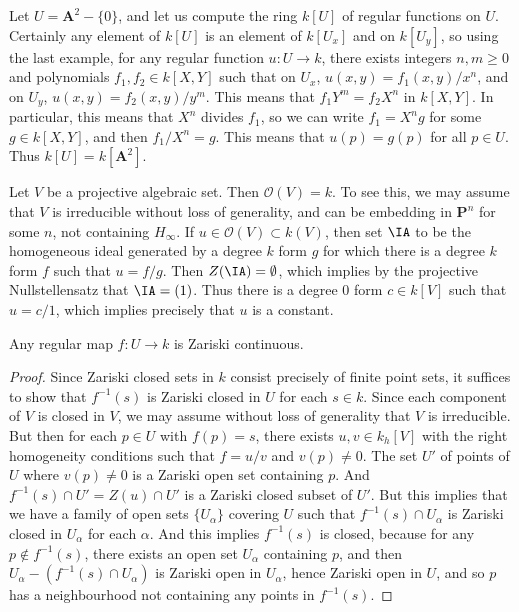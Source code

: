 \begin{example}
    Let $U = \mathbf{A}^2 - \{ 0 \}$, and let us compute the ring $k[U]$ of regular functions on $U$. Certainly any element of $k[U]$ is an element of $k[U_x]$ and on $k[U_y]$, so using the last example, for any regular function $u: U \to k$, there exists integers $n,m \geq 0$ and polynomials $f_1,f_2 \in k[X,Y]$ such that on $U_x$, $u(x,y) = f_1(x,y)/x^n$, and on $U_y$, $u(x,y) = f_2(x,y)/y^m$. This means that $f_1 Y^m = f_2 X^n$ in $k[X,Y]$. In particular, this means that $X^n$ divides $f_1$, so we can write $f_1 = X^n g$ for some $g \in k[X,Y]$, and then $f_1/X^n = g$. This means that $u(p) = g(p)$ for all $p \in U$. Thus $k[U] = k[\mathbf{A}^2]$.
\end{example}

\begin{example}
    Let $V$ be a projective algebraic set. Then $\mathcal{O}(V) = k$. To see this, we may assume that $V$ is irreducible without loss of generality, and can be embedding in $\mathbf{P}^n$ for some $n$, not containing $H_\infty$. If $u \in \mathcal{O}(V) \subset k(V)$, then set $\IA$ to be the homogeneous ideal generated by a degree $k$ form $g$ for which there is a degree $k$ form $f$ such that $u = f/g$. Then $Z(\IA) = \emptyset$, which implies by the projective Nullstellensatz that $\IA = (1)$. Thus there is a degree 0 form $c \in k[V]$ such that $u = c/1$, which implies precisely that $u$ is a constant.
\end{example}

\begin{theorem}
    Any regular map $f: U \to k$ is Zariski continuous.
\end{theorem}
\begin{proof}
    Since Zariski closed sets in $k$ consist precisely of finite point sets, it suffices to show that $f^{-1}(s)$ is Zariski closed in $U$ for each $s \in k$. Since each component of $V$ is closed in $V$, we may assume without loss of generality that $V$ is irreducible. But then for each $p \in U$ with $f(p) = s$, there exists $u,v \in k_h[V]$ with the right homogeneity conditions such that $f = u/v$ and $v(p) \neq 0$. The set $U'$ of points of $U$ where $v(p) \neq 0$ is a Zariski open set containing $p$. And $f^{-1}(s) \cap U' = Z(u) \cap U'$ is a Zariski closed subset of $U'$. But this implies that we have a family of open sets $\{ U_\alpha \}$ covering $U$ such that $f^{-1}(s) \cap U_\alpha$ is Zariski closed in $U_\alpha$ for each $\alpha$. And this implies $f^{-1}(s)$ is closed, because for any $p \not \in f^{-1}(s)$, there exists an open set $U_\alpha$ containing $p$, and then $U_\alpha - (f^{-1}(s) \cap U_\alpha)$ is Zariski open in $U_\alpha$, hence Zariski open in $U$, and so $p$ has a neighbourhood not containing any points in $f^{-1}(s)$.
\end{proof}

